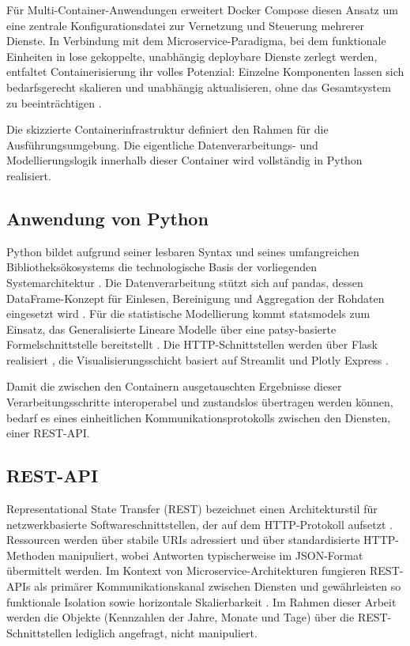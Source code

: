 Für Multi-Container-Anwendungen erweitert Docker Compose diesen Ansatz um eine zentrale Konfigurationsdatei zur Vernetzung und Steuerung mehrerer Dienste. In Verbindung mit dem Microservice-Paradigma, bei dem funktionale Einheiten in lose gekoppelte, unabhängig deploybare Dienste zerlegt werden, entfaltet Containerisierung ihr volles Potenzial: Einzelne Komponenten lassen sich bedarfsgerecht skalieren und unabhängig aktualisieren, ohne das Gesamtsystem zu beeinträchtigen \parencite[vgl.][S.~18--25]{Newman.2021}.

Die skizzierte Containerinfrastruktur definiert den Rahmen für die Ausführungsumgebung. Die eigentliche Datenverarbeitungs- und Modellierungslogik innerhalb dieser Container wird vollständig in Python realisiert.

\subsection{Anwendung von Python}
Python bildet aufgrund seiner lesbaren Syntax und seines umfangreichen Bibliotheksökosystems die technologische Basis der vorliegenden Systemarchitektur \parencite[vgl.][S.~xv--xxi.]{VanderPlas.2016}. Die Datenverarbeitung stützt sich auf pandas, dessen DataFrame-Konzept für Einlesen, Bereinigung und Aggregation der Rohdaten eingesetzt wird \parencite[vgl.][S.~104~ff.]{VanderPlas.2016}. Für die statistische Modellierung kommt statsmodels zum Einsatz, das Generalisierte Lineare Modelle über eine patsy-basierte Formelschnittstelle bereitstellt \parencite[vgl.][S.~93]{Seabold.2010}. Die HTTP-Schnittstellen werden über Flask realisiert \parencite[vgl.]{PalletsProjects.2024}, die Visualisierungsschicht basiert auf Streamlit \parencite[vgl.]{StreamlitInc.2024} und Plotly Express \parencite[vgl.]{PlotlyInc.2024}.

Damit die zwischen den Containern ausgetauschten Ergebnisse dieser Verarbeitungsschritte interoperabel und zustandslos übertragen werden können, bedarf es eines einheitlichen Kommunikationsprotokolls zwischen den Diensten, einer REST-API.

\subsection{REST-API}
Representational State Transfer (REST) bezeichnet einen Architekturstil für netzwerkbasierte Softwareschnittstellen, der auf dem HTTP-Protokoll aufsetzt \parencite[vgl.][S.~76~ff.]{Fielding.2000}. Ressourcen werden über stabile URIs adressiert und über standardisierte HTTP-Methoden manipuliert, wobei Antworten typischerweise im JSON-Format übermittelt werden. Im Kontext von Microservice-Architekturen fungieren REST-APIs als primärer Kommunikationskanal zwischen Diensten und gewährleisten so funktionale Isolation sowie horizontale Skalierbarkeit \parencite[vgl.][S.~166~ff.]{Newman.2021}. Im Rahmen dieser Arbeit werden die Objekte (Kennzahlen der Jahre, Monate und Tage) über die REST-Schnittstellen lediglich angefragt, nicht manipuliert.

